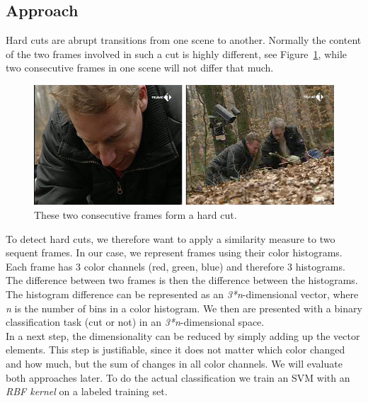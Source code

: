 \subsection{Approach}
\label{sec:hard_cut_approach}

Hard cuts are abrupt transitions from one scene to another. 
Normally the content of the two frames involved in such a cut is highly different, see Figure~\ref{fig:hard_cut_example}, while two consecutive frames in one scene will not differ that much. 

\begin{figure}
	\centering
	\includegraphics[scale=.7]{images/hard_cut_example.png}
	\caption{These two consecutive frames form a hard cut.}
	\label{fig:hard_cut_example}
\end{figure}

To detect hard cuts, we therefore want to apply a similarity measure to two sequent frames. 
In our case, we represent frames using their color histograms. 
Each frame has 3 color channels (red, green, blue) and therefore 3 histograms.
The difference between two frames is then the difference between the histograms.
The histogram difference can be represented as an \emph{3*n}-dimensional vector, where \emph{n} is the number of bins in a color histogram. 
We then are presented with a binary classification task (cut or not) in an \emph{3*n}-dimensional space. \\
In a next step, the dimensionality can be reduced by simply adding up the vector elements. 
This step is justifiable, since it does not matter which color changed and how much, but the sum of changes in all color channels. 
We will evaluate both approaches later.
To do the actual classification we train an SVM with an \emph{RBF kernel} on a labeled training set.